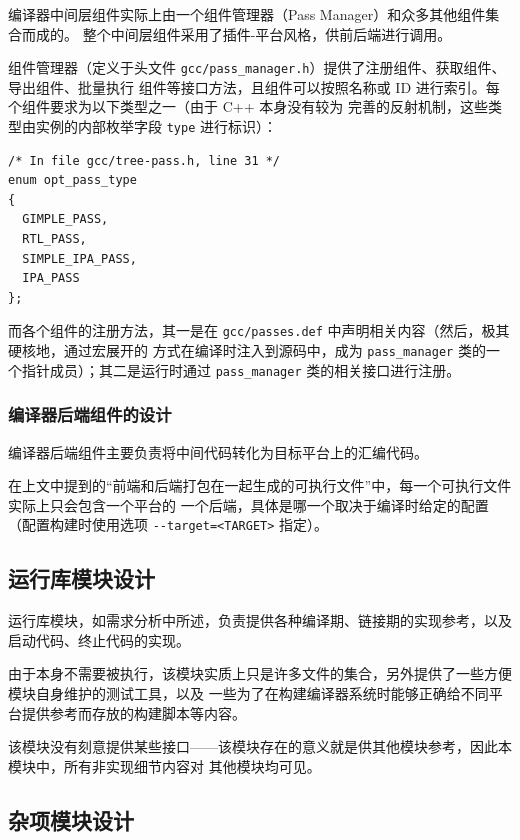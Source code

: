 \documentclass[12pt]{ctexrep}
\begin{document}
    编译器中间层组件实际上由一个组件管理器（Pass Manager）和众多其他组件集合而成的\cite{gcc-pass-manager}。
    整个中间层组件采用了插件-平台风格，供前后端进行调用。

    组件管理器（定义于头文件 \verb|gcc/pass_manager.h|）提供了注册组件、获取组件、导出组件、批量执行
    组件等接口方法，且组件可以按照名称或 ID 进行索引。每个组件要求为以下类型之一（由于 C++ 本身没有较为
    完善的反射机制，这些类型由实例的内部枚举字段 \verb|type| 进行标识）：

    \begin{verbatim}
/* In file gcc/tree-pass.h, line 31 */
enum opt_pass_type
{
  GIMPLE_PASS,
  RTL_PASS,
  SIMPLE_IPA_PASS,
  IPA_PASS
};
    \end{verbatim}

    而各个组件的注册方法，其一是在 \verb|gcc/passes.def| 中声明相关内容（然后，极其硬核地，通过宏展开的
    方式在编译时注入到源码中，成为 \verb|pass_manager| 类的一个指针成员）；其二是运行时通过 \verb|pass_manager|
    类的相关接口进行注册。

    \subsubsection{编译器后端组件的设计}

    编译器后端组件主要负责将中间代码转化为目标平台上的汇编代码。

    在上文中提到的``前端和后端打包在一起生成的可执行文件''中，每一个可执行文件实际上只会包含一个平台的
    一个后端，具体是哪一个取决于编译时给定的配置\cite{gcc-configure}（配置构建时使用选项
    \verb|--target=<TARGET>| 指定）。

    \subsection{运行库模块设计}

    运行库模块，如需求分析中所述，负责提供各种编译期、链接期的实现参考，以及启动代码、终止代码的实现。

    由于本身不需要被执行，该模块实质上只是许多文件的集合，另外提供了一些方便模块自身维护的测试工具，以及
    一些为了在构建编译器系统时能够正确给不同平台提供参考而存放的构建脚本等内容。

    该模块没有刻意提供某些接口——该模块存在的意义就是供其他模块参考，因此本模块中，所有非实现细节内容对
    其他模块均可见。

    \subsection{杂项模块设计}
\end{document}
